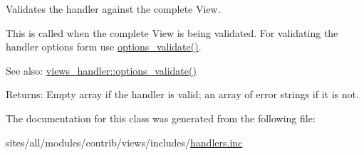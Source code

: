 Validates the handler against the complete View.

This is called when the complete View is being validated. For validating the handler options form use \hyperlink{classviews__handler_48a7b56e8952d9fcf56e2dec7794bb4e}{options\_\-validate()}.

\begin{Desc}
\item[See also:]\hyperlink{classviews__handler_48a7b56e8952d9fcf56e2dec7794bb4e}{views\_\-handler::options\_\-validate()}\end{Desc}
\begin{Desc}
\item[Returns:]Empty array if the handler is valid; an array of error strings if it is not. \end{Desc}


The documentation for this class was generated from the following file:\begin{CompactItemize}
\item 
sites/all/modules/contrib/views/includes/\hyperlink{handlers_8inc}{handlers.inc}\end{CompactItemize}
